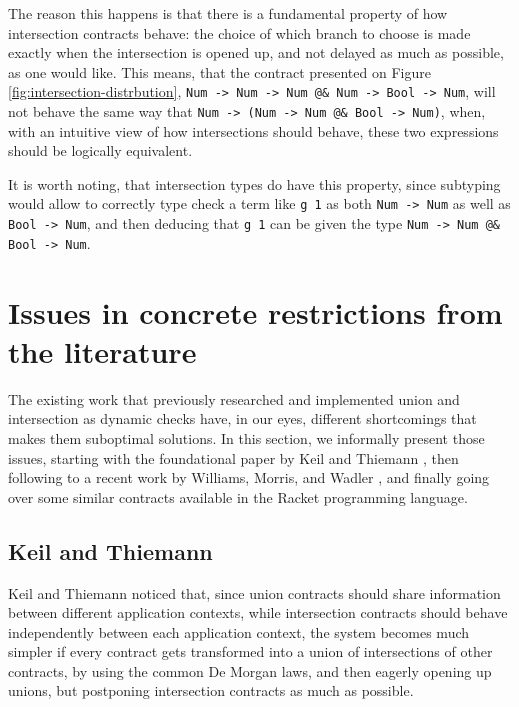 \documentclass[sigplan,10pt,review,anonymous]{acmart}
\newcommand{\unsure}[2][1=]{}
\newcommand{\info}[2][1=]{}
\newcommand{\nickel}[1]{\lstinline[language=nickel]{#1}}
\begin{document}
The reason this happens is that there is a fundamental property of how
intersection contracts behave: the choice of which branch to choose is made
exactly when the intersection is opened up, and not delayed as much as possible,
as one would like.  This means, that the contract presented on Figure
\ref{fig:intersection-distrbution}, \nickel{Num -> Num -> Num @& Num
-> Bool -> Num}, will not behave the same way that \nickel{Num ->
(Num -> Num @& Bool -> Num)}, when, with an intuitive view of how
intersections should behave, these two expressions should be logically
equivalent.

It is worth noting, that intersection types do have this property,
since subtyping would allow to correctly type check a term like
\nickel{g 1} as both \nickel{Num -> Num} as well as
\nickel{Bool -> Num}, and then deducing that \nickel{g 1}
can be given the type \nickel{Num -> Num @& Bool -> Num}.

\newpage

\section{Issues in concrete restrictions from the literature}
\label{sec:issues-literature}
\info{The various papers and the tradeoffs they make}

The existing work that previously researched and implemented
union and intersection
as dynamic checks have, in our eyes, different shortcomings
that makes them suboptimal solutions.
In this section, we informally present those issues,
starting with the foundational paper by Keil and Thiemann
\cite{KeilThiemannUnionIntersection}, then following to a recent
work by Williams, Morris, and Wadler \cite{RootCauseOfBlame}, and
finally going over some similar contracts available in the Racket
programming language.

\subsection*{Keil and Thiemann}
\label{sec:keil-thiemann}
\unsure{Subsection title?}
Keil and Thiemann noticed that, since union contracts should share information between
different application contexts, while intersection contracts should behave
independently between each application context, the system becomes much
simpler if every contract gets transformed into a union of intersections
of other contracts, by using the common De Morgan laws,
and then eagerly opening up unions, but postponing intersection
contracts as much as possible.
\end{document}

